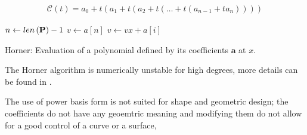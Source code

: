 \begin{align}
  \mathcal{C}(t) = a_0 + t \left( a_1 + t \left( a_2 + t \left( \dots  + t \left( a_{n-1} + t a_{n}    \right)   \right) \right) \right) 
  \label{eq:horner-algoritm}
\end{align}

\begin{minipage}{\textwidth}
  \begin{algorithm}[H]
  \DontPrintSemicolon
  \SetAlgoLined
  \BlankLine

  $n \gets {\sc len } \left( \mathbf{P} \right) - 1$\;
  $v \gets a[n]$\;
   {
    $v \gets v x + a[i]$\;
  }
  \;

  \caption{{\sc Horner}: Evaluation of a polynomial defined by its coefficients $\mathbf{a}$ at $x$.}
  \label{algo:horner}
  \end{algorithm} 
\end{minipage}

%

\begin{remark}
  The Horner algorithm is numerically unstable for high degrees, more details can be found in  \cite{FAROUKI1987191} \cite{FAROUKI19881} \cite{HighamBook2002} \cite{Boldo2004}.
\end{remark}


\begin{remark}
  The use of power basis form is not suited for shape and geometric design; the coefficients do not have any geoemtric meaning and modifying them do not allow for a good control of a curve or a surface,  
\end{remark}

